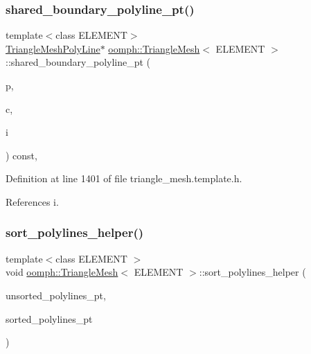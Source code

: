 \subsubsection{\texorpdfstring{shared\+\_\+boundary\+\_\+polyline\+\_\+pt()}{shared\_boundary\_polyline\_pt()}\hspace{0.1cm}{\footnotesize\ttfamily [2/2]}}
{\footnotesize\ttfamily template$<$class E\+L\+E\+M\+E\+NT$>$ \\
\hyperlink{classoomph_1_1TriangleMeshPolyLine}{Triangle\+Mesh\+Poly\+Line}$\ast$ \hyperlink{classoomph_1_1TriangleMesh}{oomph\+::\+Triangle\+Mesh}$<$ E\+L\+E\+M\+E\+NT $>$\+::shared\+\_\+boundary\+\_\+polyline\+\_\+pt (\begin{DoxyParamCaption}\item[{const unsigned \&}]{p,  }\item[{const unsigned \&}]{c,  }\item[{const unsigned \&}]{i }\end{DoxyParamCaption}) const\hspace{0.3cm}{\ttfamily [inline]}, {\ttfamily [protected]}}



Definition at line 1401 of file triangle\+\_\+mesh.\+template.\+h.



References i.

\mbox{\label{classoomph_1_1TriangleMesh_a632ac516b32a114af5b80eb25a87aed5}} 
\subsubsection{\texorpdfstring{sort\+\_\+polylines\+\_\+helper()}{sort\_polylines\_helper()}}
{\footnotesize\ttfamily template$<$class E\+L\+E\+M\+E\+NT $>$ \\
void \hyperlink{classoomph_1_1TriangleMesh}{oomph\+::\+Triangle\+Mesh}$<$ E\+L\+E\+M\+E\+NT $>$\+::sort\+\_\+polylines\+\_\+helper (\begin{DoxyParamCaption}\item[{\hyperlink{classoomph_1_1Vector}{Vector}$<$ \hyperlink{classoomph_1_1TriangleMeshPolyLine}{Triangle\+Mesh\+Poly\+Line} $\ast$$>$ \&}]{unsorted\+\_\+polylines\+\_\+pt,  }\item[{\hyperlink{classoomph_1_1Vector}{Vector}$<$ \hyperlink{classoomph_1_1Vector}{Vector}$<$ \hyperlink{classoomph_1_1TriangleMeshPolyLine}{Triangle\+Mesh\+Poly\+Line} $\ast$$>$ $>$ \&}]{sorted\+\_\+polylines\+\_\+pt }\end{DoxyParamCaption})\hspace{0.3cm}{\ttfamily [protected]}}



